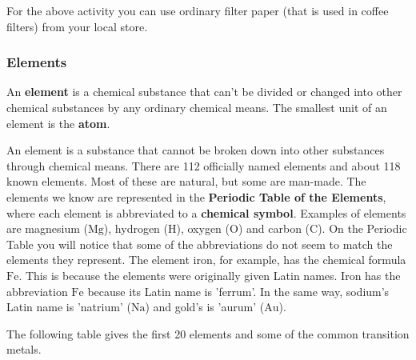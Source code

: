 \par \label{m38708*eip-392}
	\Tip
      {For the above activity you can use ordinary filter paper (that is used in coffee filters) from your local store.}
	\par
      \label{m38708*uid25}
            \subsubsection{ Elements}
            \nopagebreak
        \label{m38708*id63302}An \textbf{element} is a chemical substance that can't be divided or changed into other chemical substances by any ordinary chemical means. The smallest unit of an element is the \textbf{atom}.\par 
\label{m38708*fhsst!!!underscore!!!id193}
{ \label{m38708*meaningfhsst!!!underscore!!!id193}
An element is a substance that cannot be broken down into other substances through chemical means.} 
        \label{m38708*id63334}There are 112 officially named elements and about 118 known elements. Most of these are natural, but some are man-made. The elements we know are represented in the \textbf{Periodic Table of the Elements}, where each element is abbreviated to a \textbf{chemical symbol}. Examples of elements are magnesium ($\mathrm{Mg}$), hydrogen ($\mathrm{H}$), oxygen ($\mathrm{O}$) and carbon ($\mathrm{C}$). On the Periodic Table you will notice that some of the abbreviations do not seem to match the elements they represent. The element iron, for example, has the chemical formula $\mathrm{Fe}$. This is because the elements were originally given Latin names. Iron has the abbreviation $\mathrm{Fe}$ because its Latin name is 'ferrum'. In the same way, sodium's Latin name is 'natrium' ($\mathrm{Na}$) and gold's is 'aurum' ($\mathrm{Au}$).\par \label{m38708*eip-775}
The following table gives the first 20 elements and some of the common transition metals.\par
